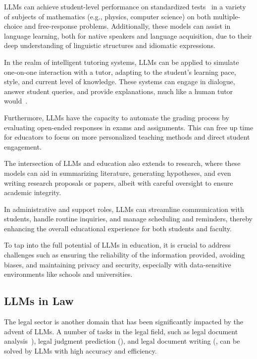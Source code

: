 LLMs can achieve student-level performance on standardized tests~\cite{openai2024gpt4} in a variety of subjects of mathematics (e.g., physics, computer science) on both multiple-choice and free-response problems.
Additionally, these models can assist in language learning, both for native speakers and language acquisition, due to their deep understanding of linguistic structures and idiomatic expressions.

In the realm of intelligent tutoring systems, LLMs can be applied to simulate one-on-one interaction with a tutor, adapting to the student's learning pace, style, and current level of knowledge.
These systems can engage in dialogue, answer student queries, and provide explanations, much like a human tutor would~\cite{malinka2023educationalimpact,susnjak2022chatgpt}.

Furthermore, LLMs have the capacity to automate the grading process by evaluating open-ended responses in exams and assignments.
This can free up time for educators to focus on more personalized teaching methods and direct student engagement.

The intersection of LLMs and education also extends to research, where these models can aid in summarizing literature, generating hypotheses, and even writing research proposals or papers, albeit with careful oversight to ensure academic integrity.

In administrative and support roles, LLMs can streamline communication with students, handle routine inquiries, and manage scheduling and reminders, thereby enhancing the overall educational experience for both students and faculty.

To tap into the full potential of LLMs in education, it is crucial to address challenges such as ensuring the reliability of the information provided, avoiding biases, and maintaining privacy and security, especially with data-sensitive environments like schools and universities.

\subsection{LLMs in Law}
\label{subsec:llms-in-law}


The legal sector is another domain that has been significantly impacted by the advent of LLMs.
A number of tasks in the legal field, such as legal document analysis~\cite{blairstanek2023gpt3statutory}), legal judgment prediction (\textcite{trautmann2022legalprompt}), and legal document writing (\textcite{choi2023chatgptlaw}, can be solved by LLMs with high accuracy and efficiency.

